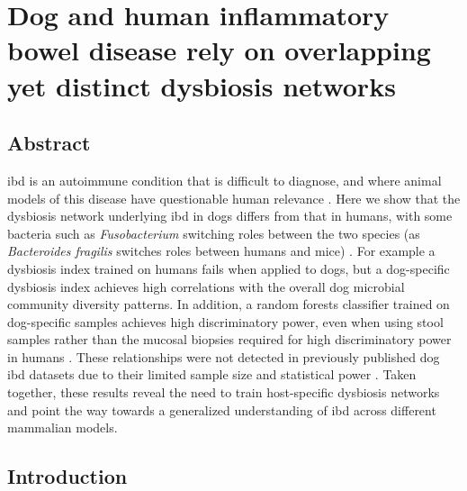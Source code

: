 \glsresetall

\chapter{Dog and human inflammatory bowel disease rely on overlapping yet distinct dysbiosis networks}

\section{Abstract}

\Gls{ibd} is an autoimmune condition that is difficult to diagnose, and where animal models of this disease have questionable human relevance \cite{RN17324}. Here we show that the dysbiosis network underlying \gls{ibd} in dogs differs from that in humans, with some bacteria such as \textit{Fusobacterium} switching roles between the two species (as \textit{Bacteroides fragilis} switches roles between humans and mice) \cite{RN154}. For example a dysbiosis index trained on humans fails when applied to dogs, but a dog-specific dysbiosis index achieves high correlations with the overall dog microbial community diversity patterns. In addition, a random forests classifier trained on dog-specific samples achieves high discriminatory power, even when using stool samples rather than the mucosal biopsies required for high discriminatory power in humans \cite{RN154}. These relationships were not detected in previously published dog \gls{ibd} datasets due to their limited sample size and statistical power \cite{RN147}. Taken together, these results reveal the need to train host-specific dysbiosis networks and point the way towards a generalized understanding of \gls{ibd} across different mammalian models.

\section{Introduction}

